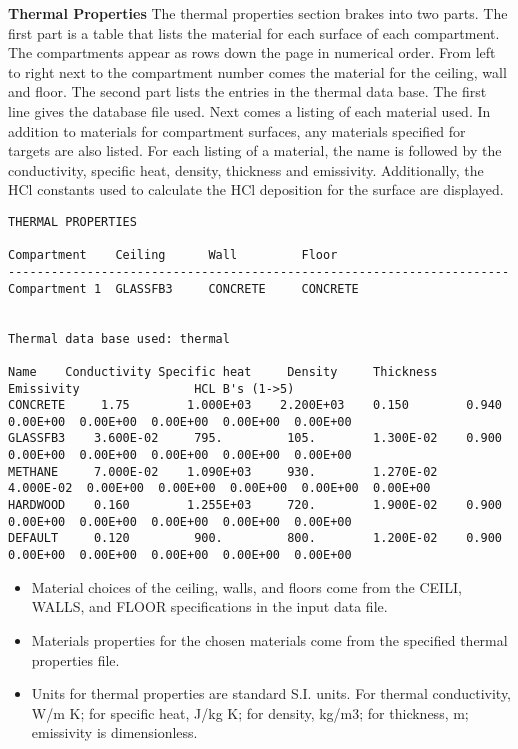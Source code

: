 \textbf{Thermal Properties} The thermal properties section brakes into two parts.  The first part is a table that lists the material for each surface of each compartment.  The compartments appear as rows down the page in numerical order.  From left to right next to the compartment number comes the material for the ceiling, wall and floor.  The second part lists the entries in the thermal data base.  The first line gives the database file used.  Next comes a listing of each material used. In addition to materials for compartment surfaces, any materials specified for targets are also listed.  For each listing of a material, the name is followed by the conductivity, specific heat, density, thickness and emissivity.  Additionally, the HCl constants used to calculate the HCl deposition for the surface are displayed.

\begin{lstlisting}[basicstyle=\tiny]
THERMAL PROPERTIES

Compartment    Ceiling      Wall         Floor
----------------------------------------------------------------------
Compartment 1  GLASSFB3     CONCRETE     CONCRETE


Thermal data base used: thermal             

Name    Conductivity Specific heat     Density     Thickness   Emissivity                HCL B's (1->5)
CONCRETE     1.75        1.000E+03    2.200E+03    0.150        0.940      0.00E+00  0.00E+00  0.00E+00  0.00E+00  0.00E+00
GLASSFB3    3.600E-02     795.         105.        1.300E-02    0.900      0.00E+00  0.00E+00  0.00E+00  0.00E+00  0.00E+00
METHANE     7.000E-02    1.090E+03     930.        1.270E-02    4.000E-02  0.00E+00  0.00E+00  0.00E+00  0.00E+00  0.00E+00
HARDWOOD    0.160        1.255E+03     720.        1.900E-02    0.900      0.00E+00  0.00E+00  0.00E+00  0.00E+00  0.00E+00
DEFAULT     0.120         900.         800.        1.200E-02    0.900      0.00E+00  0.00E+00  0.00E+00  0.00E+00  0.00E+00
\end{lstlisting}

\begin{itemize}
\item Material choices of the ceiling, walls, and floors come from the CEILI, WALLS, and FLOOR specifications in the input data file.
\item Materials properties for the chosen materials come from the specified thermal properties file.
\item Units for thermal properties are standard S.I. units.  For thermal conductivity, W/m K; for specific heat, J/kg K; for density, kg/m3; for thickness, m; emissivity is dimensionless.
\end{itemize}

